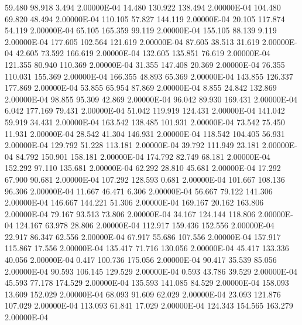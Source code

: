     59.480    98.918     3.494  2.00000E-04
    14.480   130.922   138.494  2.00000E-04
   104.480    69.820    48.494  2.00000E-04
   110.105    57.827   144.119  2.00000E-04
    20.105   117.874    54.119  2.00000E-04
    65.105   165.359    99.119  2.00000E-04
   155.105    88.139     9.119  2.00000E-04
   177.605   102.564   121.619  2.00000E-04
    87.605    38.513    31.619  2.00000E-04
    42.605    73.592   166.619  2.00000E-04
   132.605   135.851    76.619  2.00000E-04
   121.355    80.940   110.369  2.00000E-04
    31.355   147.408    20.369  2.00000E-04
    76.355   110.031   155.369  2.00000E-04
   166.355    48.893    65.369  2.00000E-04
   143.855   126.337   177.869  2.00000E-04
    53.855    65.954    87.869  2.00000E-04
     8.855    24.842   132.869  2.00000E-04
    98.855    95.309    42.869  2.00000E-04
    96.042    89.930   169.431  2.00000E-04
     6.042   177.169    79.431  2.00000E-04
    51.042   119.919   124.431  2.00000E-04
   141.042    59.919    34.431  2.00000E-04
   163.542   138.485   101.931  2.00000E-04
    73.542    75.450    11.931  2.00000E-04
    28.542    41.304   146.931  2.00000E-04
   118.542   104.405    56.931  2.00000E-04
   129.792    51.228   113.181  2.00000E-04
    39.792   111.949    23.181  2.00000E-04
    84.792   150.901   158.181  2.00000E-04
   174.792    82.749    68.181  2.00000E-04
   152.292    97.110   135.681  2.00000E-04
    62.292    28.810    45.681  2.00000E-04
    17.292    67.900    90.681  2.00000E-04
   107.292   128.593     0.681  2.00000E-04
   101.667   108.136    96.306  2.00000E-04
    11.667    46.471     6.306  2.00000E-04
    56.667    79.122   141.306  2.00000E-04
   146.667   144.221    51.306  2.00000E-04
   169.167    20.162   163.806  2.00000E-04
    79.167    93.513    73.806  2.00000E-04
    34.167   124.144   118.806  2.00000E-04
   124.167    63.978    28.806  2.00000E-04
   112.917   159.436   152.556  2.00000E-04
    22.917    86.347    62.556  2.00000E-04
    67.917    55.686   107.556  2.00000E-04
   157.917   115.867    17.556  2.00000E-04
   135.417    71.716   130.056  2.00000E-04
    45.417   133.336    40.056  2.00000E-04
     0.417   100.736   175.056  2.00000E-04
    90.417    35.539    85.056  2.00000E-04
    90.593   106.145   129.529  2.00000E-04
     0.593    43.786    39.529  2.00000E-04
    45.593    77.178   174.529  2.00000E-04
   135.593   141.085    84.529  2.00000E-04
   158.093    13.609   152.029  2.00000E-04
    68.093    91.609    62.029  2.00000E-04
    23.093   121.876   107.029  2.00000E-04
   113.093    61.841    17.029  2.00000E-04
   124.343   154.565   163.279  2.00000E-04

